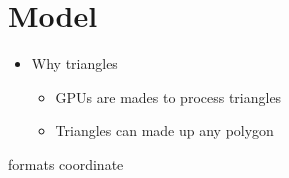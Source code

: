 \chapter{Model}

\begin{itemize}
  \item Why triangles
  \begin{itemize}
    \item GPUs are mades to process triangles
    \item Triangles can made up any polygon
  \end{itemize}
\end{itemize}

{formats}
{coordinate}
